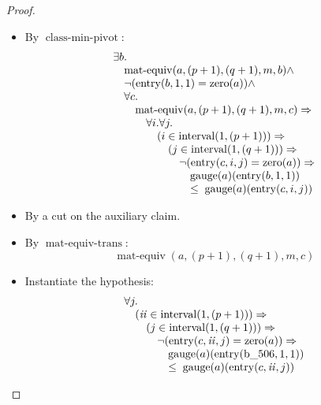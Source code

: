 \documentclass[11pt]{article}
\theoremstyle{plain}
\begin{document}
\begin{proof}
\begin{itemize}[leftmargin=2.8em, itemsep=4pt, parsep=1pt]
  \item[\textbf{15}] By $\operatorname{class\text{-}min\text{-}pivot}$:
\begin{equation*}
\begin{array}{@{}l@{}} \exists b. \\ \quad \operatorname{mat\text{-}equiv}(a, (p + 1), (q + 1), m, b) \wedge \\ \quad \neg (\operatorname{entry}(b, 1, 1) = \operatorname{zero}(a)) \wedge \\ \quad \forall c. \\ \quad \quad \operatorname{mat\text{-}equiv}(a, (p + 1), (q + 1), m, c) \Rightarrow  \\ \quad \quad \quad \forall i. \forall j. \\ \quad \quad \quad \quad (i \in \operatorname{interval}(1, (p + 1))) \Rightarrow  \\ \quad \quad \quad \quad \quad (j \in \operatorname{interval}(1, (q + 1))) \Rightarrow  \\ \quad \quad \quad \quad \quad \quad \neg (\operatorname{entry}(c, i, j) = \operatorname{zero}(a)) \Rightarrow  \\ \quad \quad \quad \quad \quad \quad \quad \operatorname{gauge}(a)(\operatorname{entry}(b, 1, 1)) \\ \quad \quad \quad \quad \quad \quad \quad \leq\; \operatorname{gauge}(a)(\operatorname{entry}(c, i, j)) \end{array}
\end{equation*}

  \item[\textbf{16--19}] By a cut on the auxiliary claim.
  \item[\textbf{20--26}] By $\operatorname{mat\text{-}equiv\text{-}trans}$:
\begin{equation*}
\operatorname{mat\text{-}equiv}(a, (p + 1), (q + 1), m, c)
\end{equation*}

  \item[\textbf{27--28}] Instantiate the hypothesis:
\begin{equation*}
\begin{array}{@{}l@{}} \forall j. \\ \quad (\mathit{ii} \in \operatorname{interval}(1, (p + 1))) \Rightarrow  \\ \quad \quad (j \in \operatorname{interval}(1, (q + 1))) \Rightarrow  \\ \quad \quad \quad \neg (\operatorname{entry}(c, \mathit{ii}, j) = \operatorname{zero}(a)) \Rightarrow  \\ \quad \quad \quad \quad \operatorname{gauge}(a)(\operatorname{entry}(\operatorname{b\_506}, 1, 1)) \\ \quad \quad \quad \quad \leq\; \operatorname{gauge}(a)(\operatorname{entry}(c, \mathit{ii}, j)) \end{array}
\end{equation*}


\end{itemize}
\end{proof}
\end{document}
